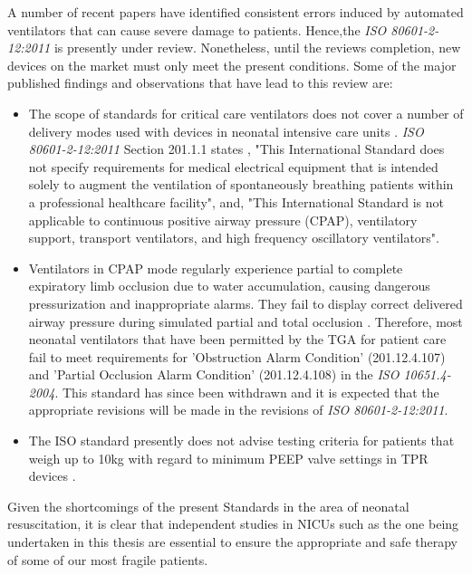 \documentclass[12pt, openany, oneside]{book}
\begin{document}
A number of recent papers have identified consistent errors induced by automated ventilators that can cause severe damage to patients. Hence,the \textit{ISO 80601-2-12:2011} is presently under review. Nonetheless, until the reviews completion, new devices on the market must only meet the present conditions. Some of the major published findings and observations that have lead to this review are:
\begin{itemize}
\item The scope of standards for critical care ventilators does not cover a number of delivery modes used with devices in neonatal intensive care units \cite{muzza}. \textit{ISO 80601-2-12:2011} Section 201.1.1 states \cite{iso}, "This International Standard does not specify requirements for medical electrical equipment that is intended solely to augment the ventilation of spontaneously breathing patients within a professional healthcare facility", and, "This International Standard is not applicable to continuous positive airway pressure (CPAP), ventilatory support, transport ventilators, and high frequency oscillatory ventilators".
\item Ventilators in CPAP mode regularly experience partial to complete expiratory limb occlusion due to water accumulation, causing dangerous pressurization and inappropriate alarms. They fail to display correct delivered airway pressure during simulated partial and total occlusion  \cite{hinder2016}. Therefore, most neonatal ventilators that have been permitted by the TGA for patient care fail to meet requirements for 'Obstruction Alarm Condition' (201.12.4.107) and 'Partial Occlusion Alarm Condition' (201.12.4.108) \cite{muzza} in the \textit{ISO 10651.4-2004}. This standard has since been withdrawn and it is expected that the appropriate revisions will be made in the revisions of \textit{ISO 80601-2-12:2011}.
\item The ISO standard presently does not advise testing criteria for patients that weigh up to 10kg with regard to minimum PEEP valve settings in TPR devices \cite{hinder2019t}.

\end{itemize} 

Given the shortcomings of the present Standards in the area of neonatal resuscitation, it is clear that independent studies in NICUs such as the one being undertaken in this thesis are essential to ensure the appropriate and safe therapy of some of our most fragile patients.
\end{document}
